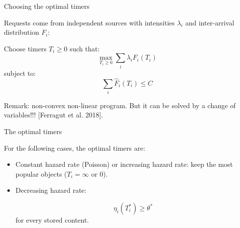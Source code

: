 \documentclass[aspectratio=169]{beamer}
\begin{document}
\begin{frame}{Choosing the optimal timers}

	Requests come from independent sources with intensities $\lambda_i$ and inter-arrival distribution $F_i$:

	\vfill

	\begin{problem}
		Choose timers $T_i\geqslant 0$ such that:
		\begin{equation*}
			\max_{T_i\geqslant 0} \sum_i \lambda_i F_i(T_i)
		\end{equation*}
		subject to:
		\begin{equation*}
			\sum_i \hat{F}_i(T_i) \leqslant C
		\end{equation*}
	\end{problem}

	\vfill
	\alert{Remark:} non-convex non-linear program. But it can be solved by a change of variables!!! [Ferragut et al. 2018].
\end{frame}

\begin{frame}{The optimal timers}

	\begin{theorem}
		For the following cases, the optimal timers are:

		\begin{itemize}
			\item Constant hazard rate (Poisson) or increasing hazard rate: keep the most popular objects ($T_i=\infty$ or $0$).
			
			\item Decreasing hazard rate:
			
			\begin{equation*}
				\eta_i (T_i^*) \geqslant \theta^*
			   \end{equation*}
			  for every stored content.
		\end{itemize}
	\end{theorem}
	\pause
	\vfill
\end{frame}
\end{document}
